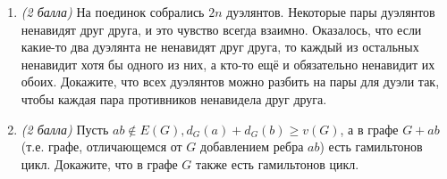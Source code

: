 \documentclass{article}
\begin{document}
\begin{enumerate}
    \item \textit{(2 балла)} На поединок собрались $2n$ дуэлянтов. Некоторые пары дуэлянтов ненавидят друг друга, и это чувство всегда взаимно. Оказалось, что если какие-то два дуэлянта не ненавидят друг друга, то каждый из остальных ненавидит хотя бы одного из них, а кто-то ещё и обязательно ненавидит их обоих. Докажите, что всех дуэлянтов можно разбить на пары для дуэли так, чтобы каждая пара противников ненавидела друг друга.
    
    \item \textit{(2 балла)} Пусть $ab\notin E(G), d_G(a) + d_G(b)\geq v(G)$, а в графе $G + ab$ (т.е. графе, отличающемся от $G$ добавлением ребра $ab$) есть гамильтонов цикл. Докажите, что в графе $G$ также есть гамильтонов цикл.
    
\end{enumerate}
\end{document}
